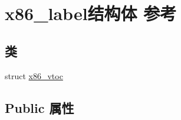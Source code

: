 \hypertarget{structx86__label}{}\section{x86\+\_\+label结构体 参考}
\label{structx86__label}
\subsection*{类}
\begin{DoxyCompactItemize}
\item 
struct \hyperlink{structx86__label_1_1x86__vtoc}{x86\+\_\+vtoc}
\end{DoxyCompactItemize}
\subsection*{Public 属性}
